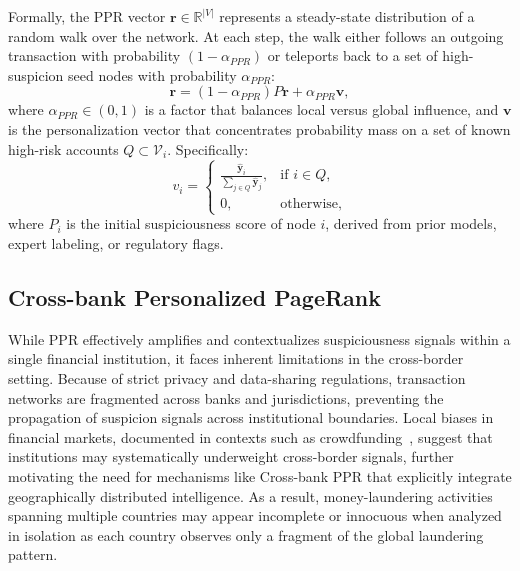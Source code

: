 \documentclass[11pt,english]{article}
\renewcommand{\hat}{\widehat}
\begin{document}
Formally, the PPR vector $\boldsymbol{r} \in \mathbb{R}^{|V|}$ represents a steady-state distribution of a random walk over the network. At each step, the walk either follows an outgoing transaction with probability $(1-\alpha_{PPR})$ or teleports back to a set of high-suspicion seed nodes with probability $\alpha_{PPR}$:
\begin{equation}
    \boldsymbol{r} = (1 - \alpha_{PPR})P \boldsymbol{r} + \alpha_{PPR} \boldsymbol{v},
\label{eq:ppr}
\end{equation}
where $\alpha_{PPR} \in (0,1)$ is a factor that balances local versus global influence, and $\boldsymbol{v}$ is the personalization vector that concentrates probability mass on a set of known high-risk accounts $Q \subset \mathcal{V}_i$. Specifically:
\begin{equation}
v_i = 
\begin{cases}
    \frac{\hat{\mathbf{y}}_i}{\sum_{j \in Q} \hat{\mathbf{y}}_j}, & \text{if } i \in Q, \\
    0, & \text{otherwise,}
\end{cases}
\end{equation}
where $P_i$ is the initial suspiciousness score of node $i$, derived from prior models, expert labeling, or regulatory flags. 


\subsection{Cross-bank Personalized PageRank}
While PPR effectively amplifies and contextualizes suspiciousness signals within a single financial institution, it faces inherent limitations in the cross-border setting. Because of strict privacy and data-sharing regulations, transaction networks are fragmented across banks and jurisdictions, preventing the propagation of suspicion signals across institutional boundaries. Local biases in financial markets, documented in contexts such as crowdfunding~\parencite{ni2025xinyang}, suggest that institutions may systematically underweight cross-border signals, further motivating the need for mechanisms like Cross-bank PPR that explicitly integrate geographically distributed intelligence. As a result, money-laundering activities spanning multiple countries may appear incomplete or innocuous when analyzed in isolation as each country observes only a fragment of the global laundering pattern.  
\end{document}

